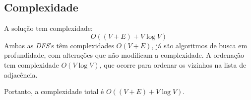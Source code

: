 \documentclass[12pt, letterpaper]{article}
\begin{document}
        \subsection{Complexidade}
            A solução tem complexidade:
            $$ O((V + E) + V\log{V}) $$
            Ambas as \emph{DFS}'s têm complexidades $O(V + E)$, já são algoritmos de busca em profundidade, com alterações que não modificam a complexidade. A ordenação tem complexidade $O(V\log{V})$, que ocorre para ordenar os vizinhos na lista de adjacência.

            Portanto, a complexidade total é $O((V + E) + V\log{V})$.
\end{document}
